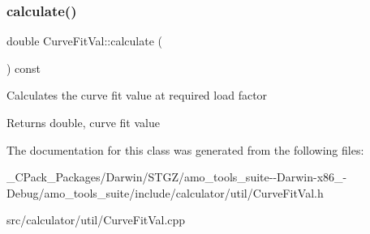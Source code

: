 \subsubsection{\texorpdfstring{calculate()}{calculate()}\hspace{0.1cm}{\footnotesize\ttfamily [3/3]}}
{\footnotesize\ttfamily double Curve\+Fit\+Val\+::calculate (\begin{DoxyParamCaption}{ }\end{DoxyParamCaption}) const}

Calculates the curve fit value at required load factor \begin{DoxyReturn}{Returns}
double, curve fit value 
\end{DoxyReturn}


The documentation for this class was generated from the following files\+:\begin{DoxyCompactItemize}
\item 
\+\_\+\+C\+Pack\+\_\+\+Packages/\+Darwin/\+S\+T\+G\+Z/amo\+\_\+tools\+\_\+suite-\/-\/\+Darwin-\/x86\+\_-\/\+Debug/amo\+\_\+tools\+\_\+suite/include/calculator/util/Curve\+Fit\+Val.\+h\item 
src/calculator/util/Curve\+Fit\+Val.\+cpp\end{DoxyCompactItemize}
